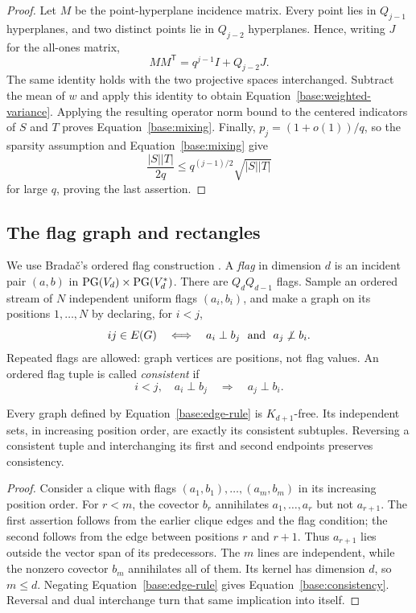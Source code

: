 \begin{proof}
Let $M$ be the point-hyperplane incidence matrix. Every point lies in
$Q_{j-1}$ hyperplanes, and two distinct points lie in $Q_{j-2}$
hyperplanes. Hence, writing $J$ for the all-ones matrix,
\[
 MM^{\mathsf T}=q^{j-1}I+Q_{j-2}J.
\]
The same identity holds with the two projective spaces interchanged.
Subtract the mean of $w$ and apply this identity to obtain
Equation~\eqref{base:weighted-variance}. Applying the resulting operator
norm bound to the centered indicators of $S$ and $T$ proves
Equation~\eqref{base:mixing}. Finally, $p_j=(1+o(1))/q$, so the sparsity
assumption and Equation~\eqref{base:mixing} give
\[
 \frac{|S||T|}{2q}
 \le q^{(j-1)/2}\sqrt{|S||T|}
\]
for large $q$, proving the last assertion.
\end{proof}

\subsection{The flag graph and rectangles}

We use Brada\v{c}'s ordered flag construction
\cite[Section~2.5]{Bradac2026}. A \emph{flag} in dimension $d$ is an incident pair $(a,b)$ in
$\operatorname{PG}(V_d)\times\operatorname{PG}(V_d^*)$. There are $Q_dQ_{d-1}$ flags. Sample an
ordered stream of $N$ independent uniform flags $(a_i,b_i)$, and make
a graph on its positions $1,\ldots,N$ by declaring, for $i<j$,
\begin{equation}
 ij\in E(G)\quad\Longleftrightarrow\quad
 a_i\perp b_j\ \hbox{ and }\ a_j\not\perp b_i.
 \label{base:edge-rule}
\end{equation}
Repeated flags are allowed: graph vertices are positions, not flag
values. An ordered flag tuple is called \emph{consistent} if
\begin{equation}
 i<j,\quad a_i\perp b_j\quad\Longrightarrow\quad a_j\perp b_i.
 \label{base:consistency}
\end{equation}

\begin{lemma}
\label{base:flag-graph}
Every graph defined by Equation~\eqref{base:edge-rule} is $K_{d+1}$-free.
Its independent sets, in increasing position order, are exactly its
consistent subtuples. Reversing a consistent tuple and interchanging
its first and second endpoints preserves consistency.
\end{lemma}

\begin{proof}
Consider a clique with flags $(a_1,b_1),\ldots,(a_m,b_m)$ in its
increasing position order. For $r<m$, the covector $b_r$ annihilates
$a_1,\ldots,a_r$ but not $a_{r+1}$. The first assertion follows from
the earlier clique edges and the flag condition; the second follows
from the edge between positions $r$ and $r+1$. Thus $a_{r+1}$ lies
outside the vector span of its predecessors. The $m$ lines are
independent, while the nonzero covector $b_m$ annihilates all of them.
Its kernel has dimension $d$, so $m\le d$.
Negating Equation~\eqref{base:edge-rule} gives
Equation~\eqref{base:consistency}. Reversal and dual interchange turn
that same implication into itself.
\end{proof}

